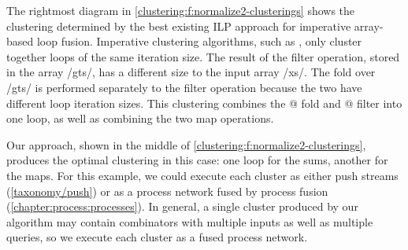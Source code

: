 The rightmost diagram in \cref{clustering:f:normalize2-clusterings} shows the clustering determined by the best existing ILP approach for imperative array-based loop fusion.
Imperative clustering algorithms, such as \citet{megiddo1998optimal}, only cluster together loops of the same iteration size.
The result of the filter operation, stored in the array \Hs/gts/, has a different size to the input array \Hs/xs/.
The fold over \Hs/gts/ is performed separately to the filter operation because the two have different loop iteration sizes.
This clustering combines the @ fold and @ filter into one loop, as well as combining the two map operations.

Our approach, shown in the middle of \cref{clustering:f:normalize2-clusterings}, produces the optimal clustering in this case: one loop for the sums, another for the maps.
For this example, we could execute each cluster as either push streams (\cref{taxonomy/push}) or as a process network fused by process fusion (\cref{chapter:process:processes}).
In general, a single cluster produced by our algorithm may contain combinators with multiple inputs as well as multiple queries, so we execute each cluster as a fused process network.


